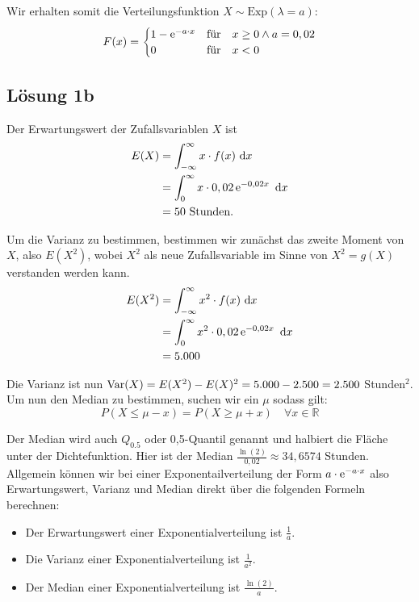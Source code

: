 \documentclass[main.tex]{subfiles}
\begin{document}
Wir erhalten somit die Verteilungsfunktion $X\sim \text{Exp}(\lambda = a)$:
$$
	F(x) = \begin{cases}
		1 - \operatorname{\mathrm{e}}^{-a\cdot x} & \text{für}\quad x\geq 0 \land a=0,02 \\
		0 & \text{für}\quad x < 0
	\end{cases}
$$

\subsection{Lösung 1b}

Der Erwartungswert der Zufallsvariablen $X$ ist
$$\begin{aligned}
	E(X) &= \int_{-\infty}^{\infty} x \cdot f(x) ~\mathrm{d}x \\
	&= \int_{0}^{\infty} x \cdot 0,02 \operatorname{\mathrm{e}}^{-0,02x} ~\mathrm{d}x \\
	&= 50\ \text{Stunden.}
\end{aligned}$$

Um die Varianz zu bestimmen, bestimmen wir zunächst das zweite Moment von $X$, also $E(X^2)$, wobei $X^2$ als neue Zufallsvariable im Sinne von $X^2=g(X)$ verstanden werden kann.
$$\begin{aligned}
	E(X^2) &= \int_{-\infty}^{\infty} x^2 \cdot f(x) ~\mathrm{d}x \\
	&= \int_{0}^{\infty} x^2 \cdot 0,02 \operatorname{\mathrm{e}}^{-0,02x} ~\mathrm{d}x \\
	&= 5.000
\end{aligned}$$

Die Varianz ist nun $\operatorname{Var}(X) = E(X^2)-E(X)^2 = 5.000 - 2.500 = 2.500$ Stunden$^2$.\\

Um nun den Median zu bestimmen, suchen wir ein $\mu$ sodass gilt:
$$
	P(X\leq \mu - x) = P(X\geq \mu +x) \quad \forall x\in\mathbb{R}
$$

Der Median wird auch $Q_{0.5}$ oder 0,5-Quantil genannt und halbiert die Fläche unter der Dichtefunktion. Hier ist der Median $\frac{\ln(2)}{0,02}\approx 34,6574$ Stunden.\\

Allgemein können wir bei einer Exponentailverteilung der Form $a\cdot \operatorname{\mathrm{e}}^{-a\cdot x}$ also Erwartungswert, Varianz und Median direkt über die folgenden Formeln berechnen:
\begin{itemize}
\item Der Erwartungswert einer Exponentialverteilung ist $\frac{1}{a}$.
\item Die Varianz einer Exponentialverteilung ist $\frac{1}{a^2}$.
\item Der Median einer Exponentialverteilung ist $\frac{\ln(2)}{a}$.
\end{itemize}
\end{document}
